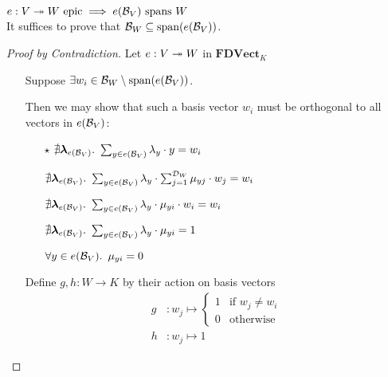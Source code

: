 \begin{lemma}\label{lemma:linear-map-epic-span}
  $e : V\twoheadrightarrow W \text{ epic} \implies e(\mathcal{B}_{V}) \text{ spans } W$\\[1em]
  It suffices to prove that $\mathcal{B}_{W} \subseteq \operatorname{span}(e(\mathcal{B}_{V}))$.

  \begin{proof}[Proof by Contradiction]
    Let $e : V \twoheadrightarrow W$ in $\mathbf{FDVect}_K$
    \begin{itemize}
      \item[\phantom{\imps}]
        Suppose ${\exists w_i\in\mathcal{B}_{W}\setminus\operatorname{span}(e(\mathcal{B}_{V}))}$.
        \marginnote{\Hyp}

      \item[\phantom{\imps}] Then we may show that such a basis vector $w_i$ must be orthogonal to all vectors in $e(\mathcal{B}_{V})$:

      \item[\phantom{\imps}]
        \begin{itemize}
          \item[$\star$]
            $\nexists \boldsymbol{\lambda}_{e(\mathcal{B}_{V})}\ldotp~\sum_{y\in e(\mathcal{B}_{V})} \lambda_y\cdot y = w_i$

          \item[\iffs]
            $\nexists \boldsymbol{\lambda}_{e(\mathcal{B}_{V})}\ldotp~\sum_{y\in e(\mathcal{B}_{V})} \lambda_y\cdot\sum_{j=1}^{\mathcal{D}_{W}}\mu_{yj}\cdot w_j = w_i$

          \item[\iffs]
            $\nexists \boldsymbol{\lambda}_{e(\mathcal{B}_{V})}\ldotp~\sum_{y\in e(\mathcal{B}_{V})} \lambda_y\cdot\mu_{yi}\cdot w_i = w_i$

          \item[\iffs]
            $\nexists \boldsymbol{\lambda}_{e(\mathcal{B}_{V})}\ldotp~\sum_{y\in e(\mathcal{B}_{V})} \lambda_y\cdot\mu_{yi} = 1$

          \item[\iffs]
            $\forall y \in e(\mathcal{B}_{V})\ldotp~\mu_{yi} = 0$
        \end{itemize}


      \item[\phantom{\imps}]
        Define $g, h : W\to K$ by their action on basis vectors
        \begin{align*}
          g & : w_j \mapsto
          \begin{cases}
            1 & \text{if }w_j \neq w_i\\
            0 & \text{otherwise}
          \end{cases}\\
          h & : w_j \mapsto 1
        \end{align*}


\end{itemize}
\end{proof}
\end{lemma}
